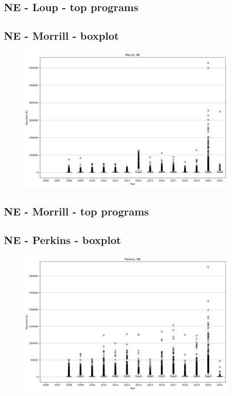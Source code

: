 \subsection*{NE - Loup - top programs}

\newpage
\subsection*{NE - Morrill - boxplot}
\begin{figure}[h]
\centering
\includegraphics[width=7in]{../output/boxplots/counties/Morrill-NE_boxplot.png}
\end{figure}


\subsection*{NE - Morrill - top programs}

\newpage
\subsection*{NE - Perkins - boxplot}
\begin{figure}[h]
\centering
\includegraphics[width=7in]{../output/boxplots/counties/Perkins-NE_boxplot.png}
\end{figure}


